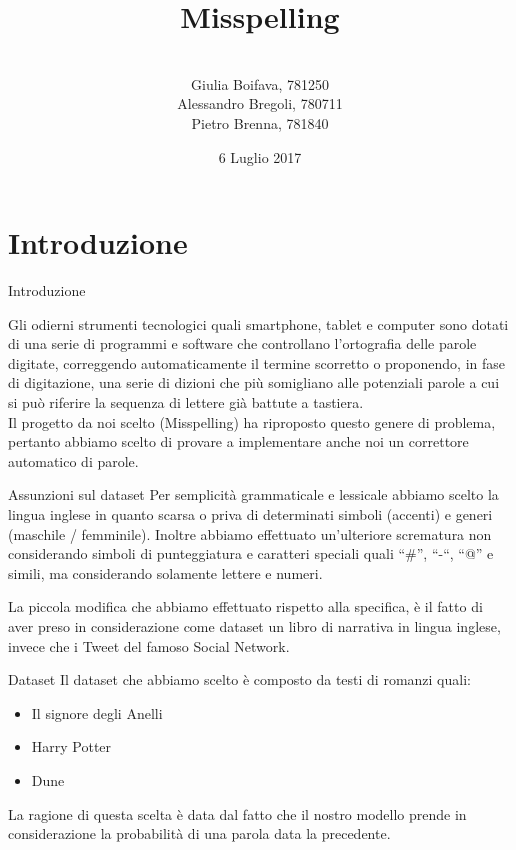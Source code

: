 \documentclass{beamer}
\title{Misspelling}
\author[Boifava, Bregoli, Brenna]{ \\ Giulia Boifava, 781250 \\ Alessandro Bregoli, 780711 \\ Pietro Brenna, 781840}
\date{6 Luglio 2017}
\begin{document}
\begin{frame}
  \titlepage
\end{frame}

\section{Introduzione}

\begin{frame}{Introduzione}


    Gli odierni strumenti tecnologici quali smartphone, tablet e computer sono dotati di una serie di programmi e software che controllano
    l’ortografia delle parole digitate, correggendo automaticamente il termine scorretto o proponendo, in fase di digitazione, una serie di
    dizioni che più somigliano alle potenziali parole a cui si può riferire la sequenza di lettere già battute a tastiera.\\
    Il progetto da noi scelto (Misspelling) ha riproposto questo genere di problema, pertanto abbiamo scelto di provare a implementare 
    anche noi un correttore automatico di parole.

\end{frame}

\begin{frame}{Assunzioni sul dataset}
Per semplicità grammaticale e lessicale abbiamo scelto la lingua inglese in quanto scarsa o priva di determinati simboli (accenti) e generi (maschile / 
femminile).
Inoltre abbiamo effettuato un’ulteriore scrematura non considerando simboli di punteggiatura e caratteri speciali quali “\#”, “-“, “@” e simili, ma 
considerando solamente lettere e numeri.

La piccola modifica che abbiamo effettuato rispetto alla specifica, è il fatto di aver preso in considerazione come dataset un libro di narrativa in 
lingua inglese, invece che i Tweet del famoso Social Network.
\end{frame}

\begin{frame}{Dataset}
Il dataset che abbiamo scelto è composto da testi di romanzi quali:
\begin{itemize}
 \item Il signore degli Anelli
 \item Harry Potter
 \item Dune
\end{itemize}
La ragione di questa scelta è data dal fatto che il nostro modello prende in considerazione
la probabilità di una parola data la precedente.
\end{frame}
\end{document}
